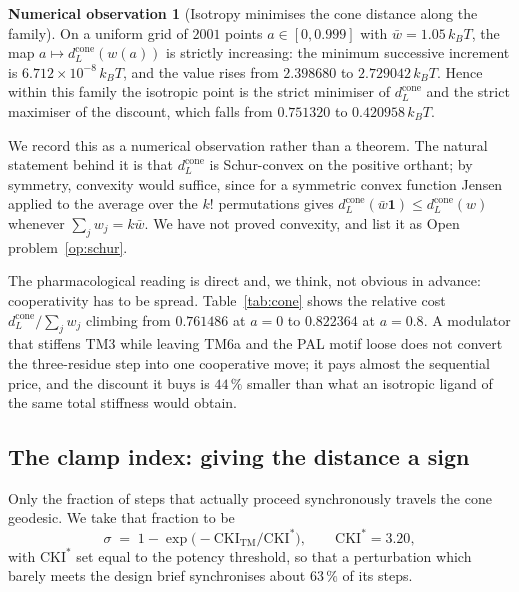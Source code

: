 \documentclass[11pt,reqno]{amsart}
\theoremstyle{plain}
\theoremstyle{definition}
\newtheorem{observation}[theorem]{Numerical observation}
\theoremstyle{remark}
\numberwithin{equation}{section}
\newcommand{\CKI}{\mathrm{CKI}}
\newcommand{\CKItm}{\CKI_{\mathrm{TM}}}
\newcommand{\dcone}{d_L^{\mathrm{cone}}}
\newcommand{\kT}{k_{B}T}
\begin{document}
\begin{observation}[Isotropy minimises the cone distance along the family]
\label{obs:mono}
On a uniform grid of $2001$ points $a\in[0,0.999]$ with $\bar w=1.05\,\kT$, the map $a\mapsto\dcone(w(a))$ is strictly increasing: the minimum successive increment is $6.712\times10^{-8}\,\kT$, and the value rises from $2.398680$ to $2.729042\,\kT$. Hence within this family the isotropic point is the strict minimiser of $\dcone$ and the strict maximiser of the discount, which falls from $0.751320$ to $0.420958\,\kT$.
\end{observation}

We record this as a numerical observation rather than a theorem. The natural statement behind it is that $\dcone$ is Schur-convex on the positive orthant; by symmetry, convexity would suffice, since for a symmetric convex function Jensen applied to the average over the $k!$ permutations gives $\dcone(\bar w\mathbf{1})\le\dcone(w)$ whenever $\sum_jw_j=k\bar w$. We have not proved convexity, and list it as Open problem~\ref{op:schur}.

The pharmacological reading is direct and, we think, not obvious in advance: cooperativity has to be spread. Table~\ref{tab:cone} shows the relative cost $\dcone/\sum_jw_j$ climbing from $0.761486$ at $a=0$ to $0.822364$ at $a=0.8$. A modulator that stiffens TM3 while leaving TM6a and the PAL motif loose does not convert the three-residue step into one cooperative move; it pays almost the sequential price, and the discount it buys is $44\,\%$ smaller than what an isotropic ligand of the same total stiffness would obtain.

\subsection{The clamp index: giving the distance a sign}
\label{sec:clamp}
Only the fraction of steps that actually proceed synchronously travels the cone geodesic. We take that fraction to be
\begin{equation}
\label{eq:sigma}
\sigma\;=\;1-\exp\bigl(-\CKItm/\CKI^\ast\bigr),\qquad \CKI^\ast=3.20,
\end{equation}
with $\CKI^\ast$ set equal to the potency threshold, so that a perturbation which barely meets the design brief synchronises about $63\,\%$ of its steps.
\end{document}
